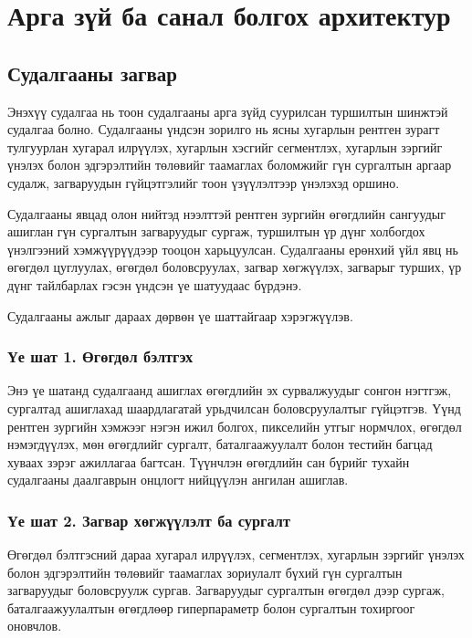 
\chapter{Арга зүй ба санал болгох архитектур}
\label{Chapter3}
\pagecolor{Beige}


\section{Судалгааны загвар}

Энэхүү судалгаа нь тоон судалгааны арга зүйд суурилсан туршилтын шинжтэй судалгаа болно. Судалгааны үндсэн зорилго нь ясны хугарлын рентген зурагт тулгуурлан хугарал илрүүлэх, хугарлын хэсгийг сегментлэх, хугарлын зэргийг үнэлэх болон эдгэрэлтийн төлөвийг таамаглах боломжийг гүн сургалтын аргаар судалж, загваруудын гүйцэтгэлийг тоон үзүүлэлтээр үнэлэхэд оршино.

Судалгааны явцад олон нийтэд нээлттэй рентген зургийн өгөгдлийн сангуудыг ашиглан гүн сургалтын загваруудыг сургаж, туршилтын үр дүнг холбогдох үнэлгээний хэмжүүрүүдээр тооцон харьцуулсан. Судалгааны ерөнхий үйл явц нь өгөгдөл цуглуулах, өгөгдөл боловсруулах, загвар хөгжүүлэх, загварыг турших, үр дүнг тайлбарлах гэсэн үндсэн үе шатуудаас бүрдэнэ.

Судалгааны ажлыг дараах дөрвөн үе шаттайгаар хэрэгжүүлэв.

\subsection*{Үе шат 1. Өгөгдөл бэлтгэх}

Энэ үе шатанд судалгаанд ашиглах өгөгдлийн эх сурвалжуудыг сонгон нэгтгэж, сургалтад ашиглахад шаардлагатай урьдчилсан боловсруулалтыг гүйцэтгэв. Үүнд рентген зургийн хэмжээг нэгэн ижил болгох, пикселийн утгыг нормчлох, өгөгдөл нэмэгдүүлэх, мөн өгөгдлийг сургалт, баталгаажуулалт болон тестийн багцад хуваах зэрэг ажиллагаа багтсан. Түүнчлэн өгөгдлийн сан бүрийг тухайн судалгааны даалгаврын онцлогт нийцүүлэн ангилан ашиглав.

\subsection*{Үе шат 2. Загвар хөгжүүлэлт ба сургалт}

Өгөгдөл бэлтгэсний дараа хугарал илрүүлэх, сегментлэх, хугарлын зэргийг үнэлэх болон эдгэрэлтийн төлөвийг таамаглах зориулалт бүхий гүн сургалтын загваруудыг боловсруулж сургав. Загваруудыг сургалтын өгөгдөл дээр сургаж, баталгаажуулалтын өгөгдлөөр гиперпараметр болон сургалтын тохиргоог оновчлов.

